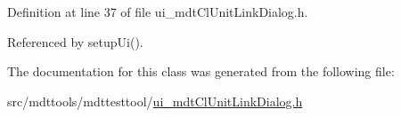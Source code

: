 Definition at line 37 of file ui\-\_\-mdt\-Cl\-Unit\-Link\-Dialog.\-h.



Referenced by setup\-Ui().



The documentation for this class was generated from the following file\-:\begin{DoxyCompactItemize}
\item 
src/mdttools/mdttesttool/\hyperlink{ui__mdt_cl_unit_link_dialog_8h}{ui\-\_\-mdt\-Cl\-Unit\-Link\-Dialog.\-h}\end{DoxyCompactItemize}
